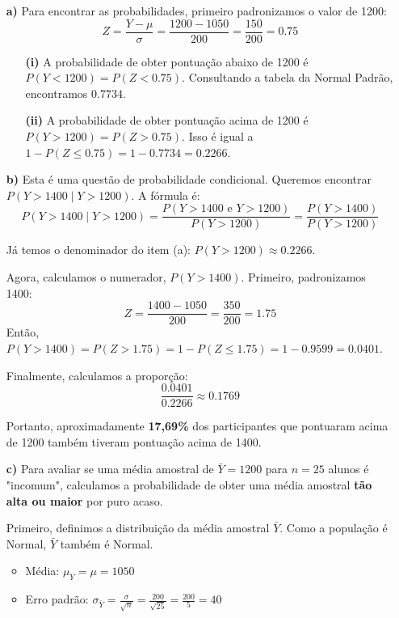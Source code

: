 \documentclass[12pt, a4paper]{article}
\begin{document}
\begin{itemize}
    \item[\textbf{a)}] Para encontrar as probabilidades, primeiro padronizamos o valor de 1200:
    $$ Z = \frac{Y - \mu}{\sigma} = \frac{1200 - 1050}{200} = \frac{150}{200} = 0.75 $$
    \begin{itemize}
        \item[\textbf{(i)}] A probabilidade de obter pontuação abaixo de 1200 é $P(Y < 1200) = P(Z < 0.75)$.
        Consultando a tabela da Normal Padrão, encontramos $\mathbf{0.7734}$.
        
        \item[\textbf{(ii)}] A probabilidade de obter pontuação acima de 1200 é $P(Y > 1200) = P(Z > 0.75)$.
        Isso é igual a $1 - P(Z \le 0.75) = 1 - 0.7734 = \mathbf{0.2266}$.
    \end{itemize}

    \item[\textbf{b)}] Esta é uma questão de probabilidade condicional. Queremos encontrar $P(Y > 1400 \mid Y > 1200)$.
    A fórmula é:
    $$ P(Y > 1400 \mid Y > 1200) = \frac{P(Y > 1400 \text{ e } Y > 1200)}{P(Y > 1200)} = \frac{P(Y > 1400)}{P(Y > 1200)} $$
    
    Já temos o denominador do item (a): $P(Y > 1200) \approx 0.2266$.
    
    Agora, calculamos o numerador, $P(Y > 1400)$. Primeiro, padronizamos 1400:
    $$ Z = \frac{1400 - 1050}{200} = \frac{350}{200} = 1.75 $$
    Então, $P(Y > 1400) = P(Z > 1.75) = 1 - P(Z \le 1.75) = 1 - 0.9599 = 0.0401$.
    
    Finalmente, calculamos a proporção:
    $$ \frac{0.0401}{0.2266} \approx 0.1769 $$
    
    Portanto, aproximadamente \textbf{17,69\%} dos participantes que pontuaram acima de 1200 também tiveram pontuação acima de 1400.

    \item[\textbf{c)}] Para avaliar se uma média amostral de $\bar{Y}=1200$ para $n=25$ alunos é "incomum", calculamos a probabilidade de obter uma média amostral \textbf{tão alta ou maior} por puro acaso.
    
    Primeiro, definimos a distribuição da média amostral $\bar{Y}$. Como a população é Normal, $\bar{Y}$ também é Normal.
    \begin{itemize}
        \item Média: $\mu_{\bar{Y}} = \mu = 1050$
        \item Erro padrão: $\sigma_{\bar{Y}} = \frac{\sigma}{\sqrt{n}} = \frac{200}{\sqrt{25}} = \frac{200}{5} = 40$
    \end{itemize}
    

\end{itemize}
\end{document}
